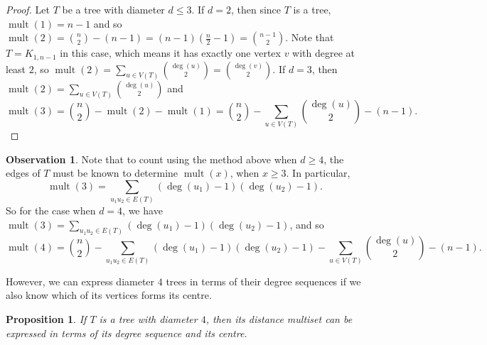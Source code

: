 \documentclass[12]{article}
\DeclareMathOperator{\mult}{mult}
\newtheorem{prop}[thm]{Proposition}
\theoremstyle{definition}
\newtheorem{obs}{Observation}
\begin{document}
	\begin{proof}
		Let $T$ be a tree with diameter $d \leq 3$.  If $d = 2$, then since $T$ is a tree, $\mult(1) = n-1$ and so $\mult(2) = {n \choose 2} - (n-1) = (n-1)(\tfrac{n}{2}-1) = {n-1 \choose 2}$.  Note that $T = K_{1,n-1}$ in this case, which means it has exactly one vertex $v$ with degree at least $2$, so $\mult(2) = \sum_{u \in V(T)} {\deg(u) \choose 2} = {\deg(v) \choose 2}$.  If $d=3$, then $\mult(2) = \sum_{u \in V(T)} {\deg(u) \choose 2}$ and 
		$$\mult(3) = {n \choose 2} - \mult(2) - \mult(1) = {n \choose 2} - \sum_{u \in V(T)} {\deg(u) \choose 2} - (n-1).$$\qedhere
	\end{proof}

	\begin{obs}
		Note that to count using the method above when $d \geq 4$, the edges of $T$ must be known to determine $\mult(x)$, when $x \geq 3$.  In particular, 
		$$\mult(3) = \sum_{u_1u_2 \in E(T)}(\deg(u_1)-1)(\deg(u_2)-1).$$  
		So for the case when $d=4$, we have $\mult(3) = \sum_{u_1u_2 \in E(T)}(\deg(u_1)-1)(\deg(u_2)-1)$, and so 
		$$\mult(4) = {n \choose 2} - \sum_{u_1u_2 \in E(T)}(\deg(u_1)-1)(\deg(u_2)-1) - \sum_{u \in V(T)}{\deg(u) \choose 2} - (n-1).$$
	\end{obs}
	
	However, we can express diameter $4$ trees in terms of their degree sequences if we also know which of its vertices forms its centre.
	
	\begin{prop}
		If $T$ is a tree with diameter $4$, then its distance multiset can be expressed in terms of its degree sequence and its centre.
	\end{prop}
\end{document}
